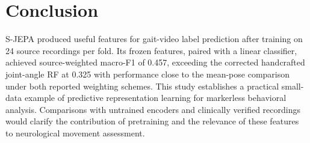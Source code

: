 \section{Conclusion}
S-JEPA produced useful features for gait-video label prediction after training on 24 source recordings per fold. Its frozen features, paired with a linear classifier, achieved source-weighted macro-F1 of 0.457, exceeding the corrected handcrafted joint-angle RF at 0.325 with performance close to the mean-pose comparison under both reported weighting schemes. This study establishes a practical small-data example of predictive representation learning for markerless behavioral analysis. Comparisons with untrained encoders and clinically verified recordings would clarify the contribution of pretraining and the relevance of these features to neurological movement assessment.
